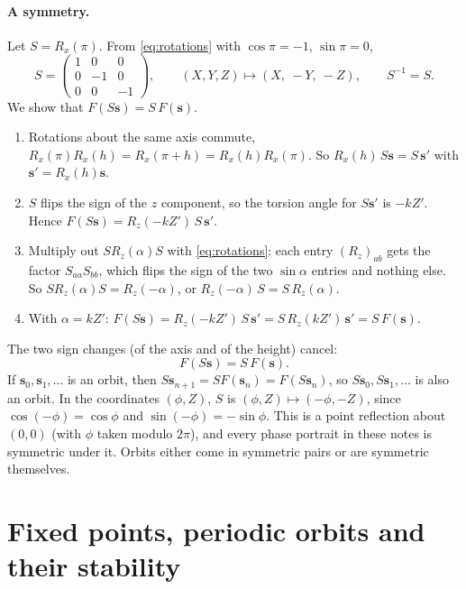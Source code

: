 \documentclass[11pt,a4paper]{article}
\newcommand{\vs}{\bm{s}}
\begin{document}
\paragraph{A symmetry.} Let $S = R_x(\pi)$. From \eqref{eq:rotations} with $\cos\pi = -1$, $\sin\pi = 0$,
\begin{equation*}
  S = \begin{pmatrix}1&0&0\\0&-1&0\\0&0&-1\end{pmatrix}, \qquad (X,Y,Z)\mapsto(X,\ -Y,\ -Z), \qquad S^{-1} = S .
\end{equation*}
We show that $F(S\vs) = S\,F(\vs)$.
\begin{enumerate}
  \item Rotations about the same axis commute, $R_x(\pi)R_x(h) = R_x(\pi+h) = R_x(h)R_x(\pi)$. So $R_x(h)\,S\vs =
  S\,\vs'$ with $\vs' = R_x(h)\vs$.
  \item $S$ flips the sign of the $z$ component, so the torsion angle for $S\vs'$ is $-kZ'$. Hence $F(S\vs) =
  R_z(-kZ')\,S\,\vs'$.
  \item Multiply out $S R_z(\alpha) S$ with \eqref{eq:rotations}: each entry $(R_z)_{ab}$ gets the factor $S_{aa}
  S_{bb}$, which flips the sign of the two $\sin\alpha$ entries and nothing else. So $S R_z(\alpha) S = R_z(-\alpha)$,
  or $R_z(-\alpha)\,S = S\,R_z(\alpha)$.
  \item With $\alpha = kZ'$: $F(S\vs) = R_z(-kZ')\,S\,\vs' = S\,R_z(kZ')\,\vs' = S\,F(\vs)$.
\end{enumerate}
The two sign changes (of the axis and of the height) cancel:
\begin{equation}\label{eq:symmetry}
  F(S\vs) = S\,F(\vs) .
\end{equation}
If $\vs_0, \vs_1, \dots$ is an orbit, then $S\vs_{n+1} = S F(\vs_n) = F(S\vs_n)$, so $S\vs_0, S\vs_1, \dots$ is also an
orbit. In the coordinates $(\phi, Z)$, $S$ is $(\phi, Z)\mapsto(-\phi, -Z)$, since $\cos(-\phi) = \cos\phi$ and
$\sin(-\phi) = -\sin\phi$. This is a point reflection about $(0, 0)$ (with $\phi$ taken modulo $2\pi$), and every
phase portrait in these notes is symmetric under it. Orbits either come in symmetric pairs or are symmetric
themselves.

\section{Fixed points, periodic orbits and their stability}\label{sec:stability}
\end{document}

